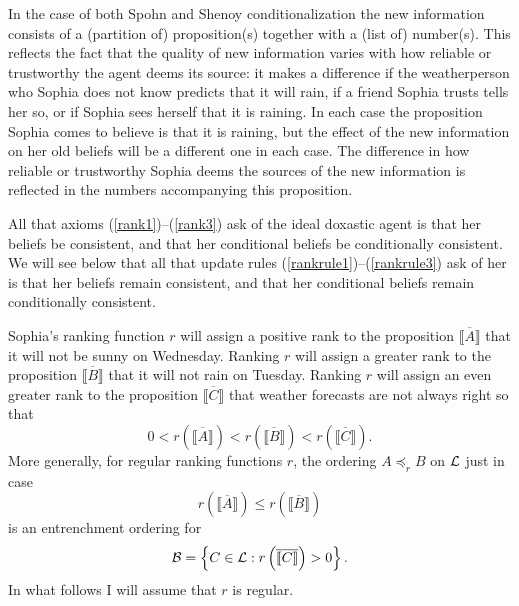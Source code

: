 In the case of both Spohn and Shenoy conditionalization the new information consists of a (partition of) proposition(s) together with a (list of) number(s). This reflects the fact that the quality of new information varies with how reliable or trustworthy the agent deems its source: it makes a difference if the weatherperson who Sophia does not know predicts that it will rain, if a friend Sophia trusts tells her so, or if Sophia sees herself that it is raining. In each case the proposition Sophia comes to believe is that it is raining, but the effect of the new information on her old beliefs will be a different one in each case. The difference in how reliable or trustworthy Sophia deems the sources of the new information is reflected in the numbers accompanying this proposition.%

All that axioms (\ref{rank1})--(\ref{rank3}) ask of the ideal doxastic agent is that her beliefs be consistent, and that her conditional beliefs be conditionally consistent. We will see below that all that update rules (\ref{rankrule1})--(\ref{rankrule3}) ask of her is that her beliefs remain consistent, and that her conditional beliefs remain conditionally consistent.

Sophia's ranking function $r$ will assign a positive rank to the proposition $\overline{\llbracket A\rrbracket}$ that it will not be sunny on Wednesday. Ranking $r$ will assign a greater rank to the proposition $\overline{\llbracket B\rrbracket}$ that it will not rain on Tuesday. Ranking $r$ will assign an even greater rank to the proposition $\overline{\llbracket C\rrbracket}$ that weather forecasts are not always right so that
$$0<r\left(\overline{\llbracket A\rrbracket}\right)<r\left(\overline{\llbracket B\rrbracket}\right)<r\left(\overline{\llbracket C\rrbracket}\right).$$
More generally, for regular ranking functions $r$, the ordering $A\preceq_r B$ on $\cal L$ just in case 
$$r\left(\overline{\llbracket A\rrbracket}\right)\leq r\left(\overline{\llbracket B\rrbracket}\right)$$ %
is an entrenchment ordering for
$$\begin{cal}B\end{cal}=\left\{C\in\begin{cal}L\end{cal}:r\left(\overline{\llbracket C\rrbracket}\right)>0\right\}.$$
In what follows I will assume that $r$ is regular.

